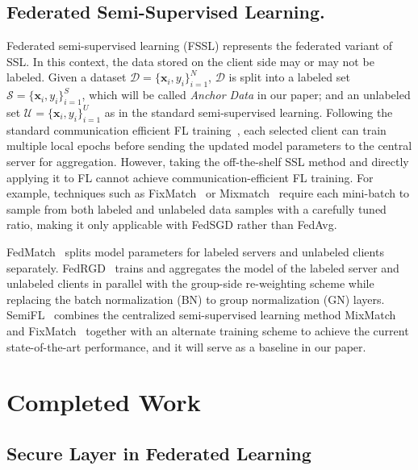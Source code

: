 \documentclass[withindex,glossary]{cam-thesis}
\begin{document}
\section{Federated Semi-Supervised Learning.} Federated semi-supervised learning (FSSL) represents the federated variant of SSL. In this context, the data stored on the client side may or may not be labeled. Given a dataset $\mathcal{D} = \{ \textbf{x}_i,y_i \}^N_{i=1}$, $\mathcal{D}$ is split into a labeled set $\mathcal{S}= \{ \textbf{x}_i,y_i \}^S_{i=1}$, which will be called \textit{Anchor Data} in our paper; and an unlabeled set $\mathcal{U}= \{ \textbf{x}_i,y_i \}^U_{i=1}$ as in the standard semi-supervised learning. Following the standard communication efficient FL training~\citep{fedavg}, each selected client can train multiple local epochs before sending the updated model parameters to the central server for aggregation. However, taking the off-the-shelf SSL method and directly applying it to FL cannot achieve communication-efficient FL training. For example, techniques such as FixMatch~\citep{fixmatch} or Mixmatch~\citep{mixmatch} require each mini-batch to sample from both labeled and unlabeled data samples with a carefully tuned ratio, making it only applicable with FedSGD rather than FedAvg. 

FedMatch~\citep{fedmatch} splits model parameters for labeled servers and unlabeled clients separately. FedRGD~\citep{zhang2021improving} trains and aggregates the model of the labeled server and unlabeled clients in parallel with the group-side re-weighting scheme while replacing the batch normalization (BN) to group normalization (GN) layers. SemiFL~\citep{semifl} combines the centralized semi-supervised learning method MixMatch~\citep{mixmatch} and FixMatch~\citep{fixmatch} together with an alternate training scheme to achieve the current state-of-the-art performance, and it will serve as a baseline in our paper.

\chapter{Completed Work} \label{YearOne}
\section{Secure Layer in Federated Learning}

\end{document}
